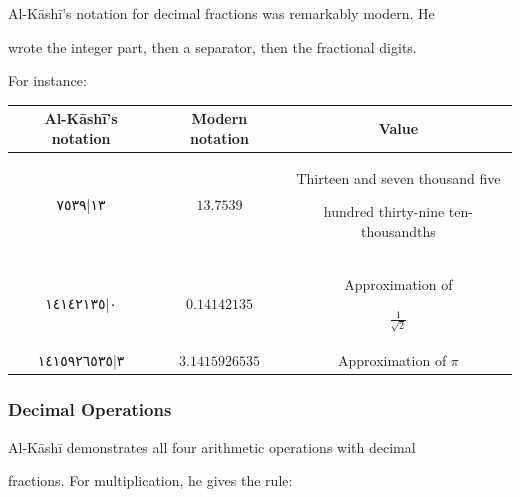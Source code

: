 \documentclass[11pt,a4paper]{article}
\newcommand{\ar}[1]{{\arabicfont\beginR #1\endR}}
\begin{document}
Al-K\=ash\=i's notation for decimal fractions was remarkably modern. He

wrote the integer part, then a separator, then the fractional digits.

For instance:



\begin{center}

\begin{tabular}{|c|c|c|}

\hline

\textbf{Al-K\=ash\=i's notation} & \textbf{Modern notation} & \textbf{Value} \\

\hline

\ar{١٣|٧٥٣٩} & $13.7539$ & Thirteen and seven thousand five

hundred thirty-nine ten-thousandths \\

\hline

\ar{٠|١٤١٤٢١٣٥} & $0.14142135$ & Approximation of

$\frac{1}{\sqrt{2}}$ \\

\hline

\ar{٣|١٤١٥٩٢٦٥٣٥} & $3.1415926535$ & Approximation of $\pi$ \\

\hline

\end{tabular}

\end{center}



\subsubsection{Decimal Operations}



Al-K\=ash\=i demonstrates all four arithmetic operations with decimal

fractions. For multiplication, he gives the rule:
\end{document}
